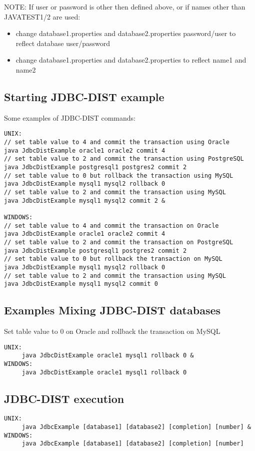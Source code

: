 \documentclass[a4paper,11pt]{article}
\begin{document}
\noindent NOTE: If user or password is other then defined above, or if names other
 than JAVATEST1/2 are used:
\begin{itemize}
\item change database1.properties and database2.properties password/user
 to reflect database user/password 
\item change database1.properties and database2.properties 
to reflect name1 and name2
\end{itemize}

\subsection{Starting JDBC-DIST example}
Some examples of JDBC-DIST commands:
\begin{verbatim}
UNIX:
// set table value to 4 and commit the transaction using Oracle 
java JdbcDistExample oracle1 oracle2 commit 4 
// set table value to 2 and commit the transaction using PostgreSQL 
java JdbcDistExample postgresql1 postgres2 commit 2 
// set table value to 0 but rollback the transaction using MySQL 
java JdbcDistExample mysql1 mysql2 rollback 0
// set table value to 2 and commit the transaction using MySQL 
java JdbcDistExample mysql1 mysql2 commit 2 &

WINDOWS:
// set table value to 4 and commit the transaction on Oracle
java JdbcDistExample oracle1 oracle2 commit 4
// set table value to 2 and commit the transaction on PostgreSQL
java JdbcDistExample postgresql1 postgres2 commit 2 
// set table value to 0 but rollback the transaction on MySQL
java JdbcDistExample mysql1 mysql2 rollback 0 
// set table value to 2 and commit the transaction using MySQL 
java JdbcDistExample mysql1 mysql2 commit 0
\end{verbatim}

\subsection{Examples Mixing JDBC-DIST databases}
Set table value to 0 on Oracle and rollback the transaction on MySQL
\begin{verbatim}
UNIX:
     java JdbcDistExample oracle1 mysql1 rollback 0 & 
WINDOWS:
     java JdbcDistExample oracle1 mysql1 rollback 0
\end{verbatim}

\subsection{JDBC-DIST execution}
\begin{verbatim}
UNIX:
     java JdbcExample [database1] [database2] [completion] [number] &
WINDOWS:
     java JdbcExample [database1] [database2] [completion] [number]
\end{verbatim}
\end{document}
